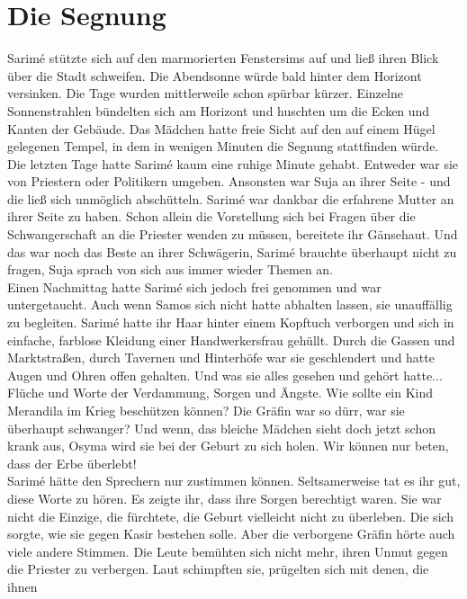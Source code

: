 \chapter{Die Segnung}

Sarimé stützte sich auf den marmorierten Fenstersims auf und ließ ihren Blick über die Stadt 
schweifen. Die Abendsonne würde bald hinter dem Horizont versinken. Die Tage wurden mittlerweile 
schon spürbar kürzer. Einzelne Sonnenstrahlen bündelten sich am Horizont und huschten um die Ecken 
und Kanten der Gebäude. Das Mädchen hatte freie Sicht auf den auf einem Hügel gelegenen Tempel, in 
dem in wenigen Minuten die Segnung stattfinden würde.\\
Die letzten Tage hatte Sarimé kaum eine ruhige Minute gehabt. Entweder war sie von Priestern oder 
Politikern umgeben. Ansonsten war Suja an ihrer Seite - und die ließ sich unmöglich abschütteln. 
Sarimé war dankbar die erfahrene Mutter an ihrer Seite zu haben. Schon allein die Vorstellung sich 
bei Fragen über die Schwangerschaft an die Priester wenden zu müssen, bereitete ihr Gänsehaut. Und 
das war noch das Beste an ihrer Schwägerin, Sarimé brauchte überhaupt nicht zu fragen, Suja sprach 
von sich aus immer wieder Themen an.\\
Einen Nachmittag hatte Sarimé sich jedoch frei genommen und war untergetaucht. Auch wenn Samos sich 
nicht hatte abhalten lassen, sie unauffällig zu begleiten. Sarimé hatte ihr Haar hinter einem 
Kopftuch verborgen und sich in einfache, farblose Kleidung einer Handwerkersfrau gehüllt. Durch die 
Gassen und Marktstraßen, durch Tavernen und Hinterhöfe war sie geschlendert und hatte Augen und 
Ohren offen gehalten. Und was sie alles gesehen und gehört hatte...\\
Flüche und Worte der Verdammung, Sorgen und Ängste. Wie sollte ein Kind Merandila im Krieg 
beschützen können? Die Gräfin war so dürr, war sie überhaupt schwanger? Und wenn, das bleiche 
Mädchen sieht doch jetzt schon krank aus, Osyma wird sie bei der Geburt zu sich holen. Wir können 
nur beten, dass der Erbe überlebt!\\
Sarimé hätte den Sprechern nur zustimmen können. Seltsamerweise tat es ihr gut, diese Worte zu 
hören. Es zeigte ihr, dass ihre Sorgen berechtigt waren. Sie war nicht die Einzige, die fürchtete, 
die Geburt vielleicht nicht zu überleben. Die sich sorgte, wie sie gegen Kasir bestehen solle. Aber 
die verborgene Gräfin hörte auch viele andere Stimmen. Die Leute bemühten sich nicht mehr, ihren 
Unmut gegen die Priester zu verbergen. Laut schimpften sie, prügelten sich mit denen, die ihnen 
